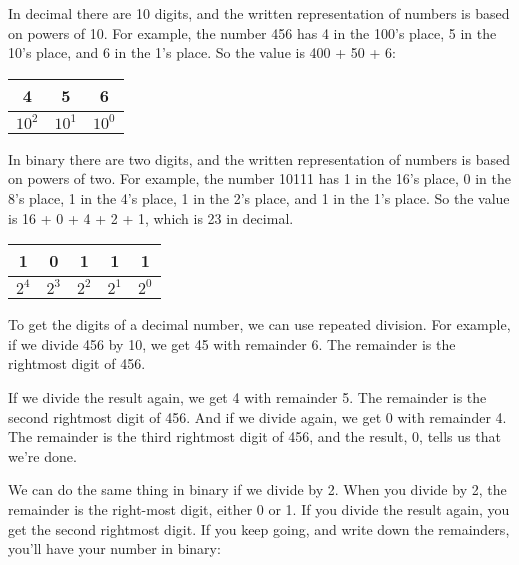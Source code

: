 

In decimal there are 10 digits, and the written representation of numbers is based on powers of 10.
For example, the number 456 has 4 in the 100's place, 5 in the 10's place, and 6 in the 1's place.
So the value is 400 + 50 + 6:

\begin{center}
\begin{tabular}{|c|c|c|}
\hline
4 & 5 & 6 \\
\hline
$10^2$ & $10^1$ & $10^0$ \\
\hline
\end{tabular}
\end{center}

In binary there are two digits, and the written representation of numbers is based on powers of two.
For example, the number 10111 has 1 in the 16's place, 0 in the 8's place, 1 in the 4's place, 1 in the 2's place, and 1 in the 1's place.
So the value is 16 + 0 + 4 + 2 + 1, which is 23 in decimal.

\begin{center}
\begin{tabular}{|c|c|c|c|c|}
\hline
1 & 0 & 1 & 1 & 1 \\
\hline
$2^4$ & $2^3$ & $2^2$ & $2^1$ & $2^0$ \\
\hline
\end{tabular}
\end{center}

To get the digits of a decimal number, we can use repeated division.
For example, if we divide 456 by 10, we get 45 with remainder 6.
The remainder is the rightmost digit of 456.

If we divide the result again, we get 4 with remainder 5.
The remainder is the second rightmost digit of 456.
And if we divide again, we get 0 with remainder 4.
The remainder is the third rightmost digit of 456, and the result, 0, tells us that we're done.

We can do the same thing in binary if we divide by 2.
When you divide by 2, the remainder is the right-most digit, either 0 or 1.
If you divide the result again, you get the second rightmost digit.
If you keep going, and write down the remainders, you'll have your number in binary:

